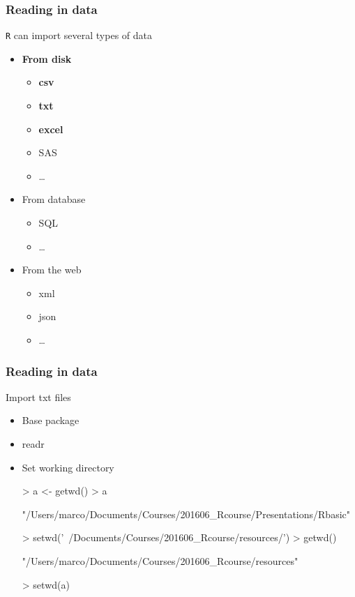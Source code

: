 \documentclass{beamer}
\begin{document}
\begin{frame}[fragile]
	\frametitle{Reading in data}
	\centering \Large \texttt{R} can import several types of data
	\begin{itemize}
		\small
		\item \textbf{From disk}
			\begin{itemize}
				\scriptsize
				\item \textbf{csv}
				\item \textbf{txt}
				\item \textbf{excel}
				\item SAS
				\item \ldots
				\small
			\end{itemize}
		\item From database
			\begin{itemize}
				\scriptsize
				\item SQL
				\item \ldots
				\small
			\end{itemize}
		\item From the web 
			\begin{itemize}
				\scriptsize
				\item xml
				\item json
				\item \ldots
				\small
			\end{itemize}
	\end{itemize}
\end{frame}



\begin{frame}[fragile]
	\frametitle{Reading in data}
	\centering \Large Import txt files
	\begin{itemize}
		\small
		\item Base package
		\item readr
	\vspace{20pt}
		\item Set working directory
\vspace{10pt}
\tiny
\setlength{\fancyvrbtopsep}{-1pt}
\setlength{\fancyvrbpartopsep}{-1pt}
\begin{Schunk}
\begin{Sinput}
> a <- getwd()
> a
\end{Sinput}
\begin{Soutput}
[1] "/Users/marco/Documents/Courses/201606_Rcourse/Presentations/Rbasic"
\end{Soutput}
\begin{Sinput}
> setwd('~/Documents/Courses/201606_Rcourse/resources/')
> getwd()
\end{Sinput}
\begin{Soutput}
[1] "/Users/marco/Documents/Courses/201606_Rcourse/resources"
\end{Soutput}
\begin{Sinput}
> setwd(a)
\end{Sinput}
\end{Schunk}
	\end{itemize}
\end{frame}
\end{document}
